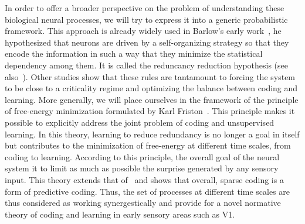 \documentclass[a4paper, 11pt, draft]{article} %
\begin{document}
In order to offer a broader perspective on the problem of understanding these biological neural processes, we will try to express it into a generic probabilistic framework. 
This approach is already widely used in Barlow's early work~\citep{barlow1961coding}, he hypothesized that neurons are driven by a self-organizing strategy so that they encode the information in such a way that they minimize the statistical dependency among them. It is called the reduncancy reduction hypothesis (see also~\citep{Atick92}). %
Other studies show that these rules are tantamount to forcing the system to be close to a criticality regime and optimizing the balance between coding and learning. %
More generally, we will place ourselves in the framework of the principle of free-energy minimization formulated by Karl Friston~\citep{Friston12}. This principle makes it possible to explicitly address the joint problem of coding and unsupervised learning. In this theory, learning to reduce redundancy is no longer a goal in itself but contributes to the minimization of free-energy at different time scales, from coding to learning. %
According to this principle, the overall goal of the neural system it to limit as much as possible the surprise generated by any sensory input. 
This theory extends that of~\citep{Olshausen97} and shows that overall, sparse coding is a form of predictive coding. Thus, the set of processes at different time scales are thus considered as working synergestically and provide for a novel normative theory of coding and learning in early sensory areas such as V1.
\end{document}
